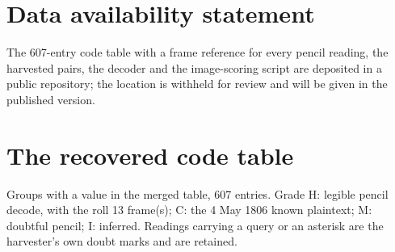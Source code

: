 \documentclass[]{interact}
\begin{document}
\section*{Data availability statement}

The 607-entry code table with a frame reference for every pencil reading, the harvested pairs, the decoder and the image-scoring script are deposited in a public repository; the location is withheld for review and will be given in the published version.





\appendix
\section{The recovered code table}\label{app:table}

Groups with a value in the merged table, 607 entries. Grade H: legible pencil decode, with the roll 13 frame(s); C: the 4 May 1806 known plaintext; M: doubtful pencil; I: inferred. Readings carrying a query or an asterisk are the harvester's own doubt marks and are retained.

{\small

}
\end{document}
